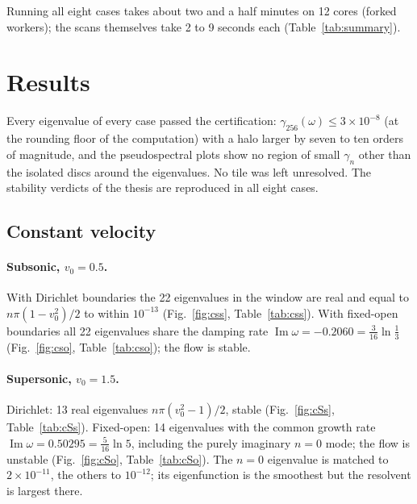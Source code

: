 \documentclass[11pt]{article}
\newcommand{\Real}{\operatorname{Re}}
\newcommand{\Imag}{\operatorname{Im}}
\newcommand{\infbeyn}{InfBeyn}
\begin{document}
Running all eight cases takes about two and a half minutes on 12 cores (forked workers); the scans
themselves take 2 to 9 seconds each (Table~\ref{tab:summary}).

\section{Results}

\begin{table}[H]
  \centering\small
  
  \caption{Summary of the \infbeyn{} scans. Eigenvalue counts are for the window $\Real\omega\in[-0.5,26]$,
  $\Imag\omega\in[-3,3]$; the growth rate is the largest $\Imag\omega$ found and the mode that attains it.}
  \label{tab:summary}
\end{table}

Every eigenvalue of every case passed the certification: $\gamma_{256}(\omega)\le 3\times10^{-8}$ (at
the rounding floor of the computation) with a halo larger by seven to ten orders of magnitude, and the
pseudospectral plots show no region of small $\gamma_n$ other than the isolated discs around the eigenvalues.
No tile was left unresolved. The stability verdicts of the thesis are reproduced in all eight cases.

\subsection{Constant velocity}

\paragraph{Subsonic, $v_0=0.5$.} With Dirichlet boundaries the 22 eigenvalues in the window are real
and equal to $n\pi(1-v_0^2)/2$ to within $10^{-13}$ (Fig.~\ref{fig:css}, Table~\ref{tab:css}). With fixed-open
boundaries all 22 eigenvalues share the damping rate $\Imag\omega = -0.2060 = \frac{3}{16}\ln\frac13$
(Fig.~\ref{fig:cso}, Table~\ref{tab:cso}); the flow is stable.

\paragraph{Supersonic, $v_0=1.5$.} Dirichlet: 13 real eigenvalues $n\pi(v_0^2-1)/2$, stable
(Fig.~\ref{fig:cSs}, Table~\ref{tab:cSs}). Fixed-open: 14 eigenvalues with the common growth rate
$\Imag\omega = 0.50295 = \frac{5}{16}\ln 5$, including the purely imaginary $n=0$ mode; the flow is unstable
(Fig.~\ref{fig:cSo}, Table~\ref{tab:cSo}). The $n=0$ eigenvalue is matched to $2\times10^{-11}$, the others
to $10^{-12}$; its eigenfunction is the smoothest but the resolvent is largest there.
\end{document}
